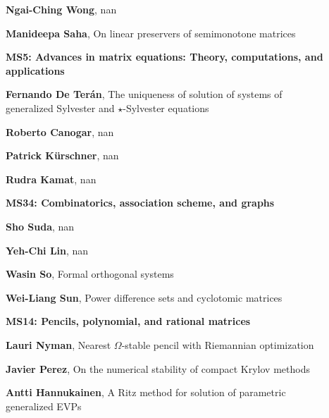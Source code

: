 \documentclass[ILAS2025-program.tex]{subfiles}
\begin{document}
\begin{description}
\begin{description}
        \item[] \textbf{Ngai-Ching Wong}, nan
        \item[] \textbf{Manideepa Saha}, On linear preservers of semimonotone matrices
        \end{description}
    \begin{description}
    \item[] {\color{mstitle}\textbf{MS5: Advances in matrix equations: Theory, computations, and applications}} 
    \item[] \textbf{Fernando De Terán}, The uniqueness of solution of systems of generalized Sylvester and $\star$-Sylvester equations
        \item[] \textbf{Roberto Canogar}, nan
        \item[] \textbf{Patrick Kürschner}, nan
        \item[] \textbf{Rudra Kamat}, nan
        \end{description}
    \begin{description}
    \item[] {\color{mstitle}\textbf{MS34: Combinatorics, association scheme, and graphs}} 
    \item[] \textbf{Sho Suda}, nan
        \item[] \textbf{Yeh-Chi Lin}, nan
        \item[] \textbf{Wasin So}, Formal orthogonal systems
        \item[] \textbf{Wei-Liang Sun}, Power difference sets and cyclotomic matrices
        \end{description}
    \begin{description}
    \item[] {\color{mstitle}\textbf{MS14: Pencils, polynomial, and rational matrices}} 
    \item[] \textbf{Lauri Nyman}, Nearest $\Omega$-stable pencil with Riemannian optimization
        \item[] \textbf{Javier Perez}, On the numerical stability of compact Krylov methods
        \item[] \textbf{Antti Hannukainen}, A Ritz method for solution of parametric generalized EVPs

\end{description}
\end{description}
\end{document}
